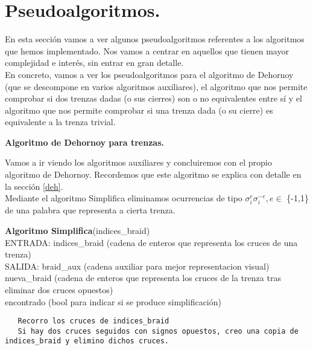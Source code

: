 
\section{Pseudoalgoritmos.}
En esta sección vamos a ver algunos pseudoalgoritmos referentes a los algoritmos que hemos implementado. Nos vamos a centrar en aquellos que tienen mayor complejidad e interés, sin entrar en gran detalle. \\

En concreto, vamos a ver los pseudoalgoritmos para el algoritmo de Dehornoy (que se descompone en varios algoritmos auxiliares), el algoritmo que nos permite comprobar si dos trenzas dadas (o sus cierres) son o no equivalentes entre sí y el algoritmo que nos permite comprobar si una trenza dada (o su cierre) es equivalente a la trenza trivial.\\

\begin{center}
	\textbf{Algoritmo de Dehornoy para trenzas.}
\end{center} 
Vamos a ir viendo los algoritmos auxiliares y concluiremos con el propio algoritmo de Dehornoy. Recordemos que este algoritmo se explica con detalle en la sección \ref{deh}.\\

Mediante el algoritmo Simplifica eliminamos ocurrencias de tipo $\sigma_{i}^{e}\sigma_{i}^{-e}, e \in$ \{-1,1\} de una palabra que representa a cierta trenza. 

\begin{alg}
	\textbf{Algoritmo Simplifica}(indices\_braid)\\
	ENTRADA: indices\_braid (cadena de enteros que representa los cruces de una trenza)\\
	SALIDA: \hspace{0.4cm} braid\_aux (cadena auxiliar para mejor representacion visual) \\
    \hspace*{2.2cm} nueva\_braid (cadena de enteros que representa los cruces de la trenza tras eliminar dos cruces opuestos)\\
    \hspace*{2.2cm} encontrado (bool para indicar si se produce simplificación)
	
\begin{lstlisting}
   Recorro los cruces de indices_braid
   Si hay dos cruces seguidos con signos opuestos, creo una copia de indices_braid y elimino dichos cruces. 
\end{lstlisting}
\end{alg}

